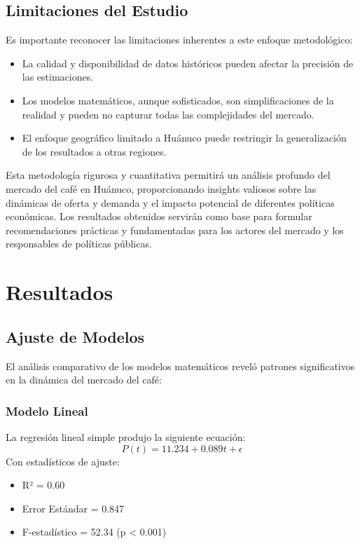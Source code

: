\documentclass[12pt, a4paper]{article}
\begin{document}
\subsection{Limitaciones del Estudio}

Es importante reconocer las limitaciones inherentes a este enfoque metodológico:

\begin{itemize}
    \item La calidad y disponibilidad de datos históricos pueden afectar la precisión de las estimaciones.
    \item Los modelos matemáticos, aunque sofisticados, son simplificaciones de la realidad y pueden no capturar todas las complejidades del mercado.
    \item El enfoque geográfico limitado a Huánuco puede restringir la generalización de los resultados a otras regiones.
\end{itemize}

Esta metodología rigurosa y cuantitativa permitirá un análisis profundo del mercado del café en Huánuco, proporcionando insights valiosos sobre las dinámicas de oferta y demanda y el impacto potencial de diferentes políticas económicas. Los resultados obtenidos servirán como base para formular recomendaciones prácticas y fundamentadas para los actores del mercado y los responsables de políticas públicas.
\section{Resultados}
\subsection{Ajuste de Modelos}
El análisis comparativo de los modelos matemáticos reveló patrones significativos en la dinámica del mercado del café:

\subsubsection{Modelo Lineal}
La regresión lineal simple produjo la siguiente ecuación:
\[ P(t) = 11.234 + 0.089t + \epsilon \]
Con estadísticos de ajuste:
\begin{itemize}
    \item R² = 0.60
    \item Error Estándar = 0.847
    \item F-estadístico = 52.34 (p < 0.001)
\end{itemize}
\end{document}
